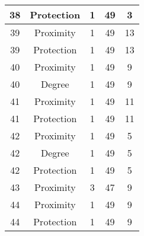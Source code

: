 \documentclass[results.tex]{subfiles}
\begin{document}
\begin{center}
\begin{tabular}{| c || c | c | c | c |}
            \hline
            38                      & Protection                   & 1                      & 49                      & 3                    \\
            \hline
            39                      & Proximity                    & 1                      & 49                      & 13                   \\
            \hline
            39                      & Protection                   & 1                      & 49                      & 13                   \\
            \hline
            40                      & Proximity                    & 1                      & 49                      & 9                    \\
            \hline
            40                      & Degree                       & 1                      & 49                      & 9                    \\
            \hline
            41                      & Proximity                    & 1                      & 49                      & 11                   \\
            \hline
            41                      & Protection                   & 1                      & 49                      & 11                   \\
            \hline
            42                      & Proximity                    & 1                      & 49                      & 5                    \\
            \hline
            42                      & Degree                       & 1                      & 49                      & 5                    \\
            \hline
            42                      & Protection                   & 1                      & 49                      & 5                    \\
            \hline
            43                      & Proximity                    & 3                      & 47                      & 9                    \\
            \hline
            44                      & Proximity                    & 1                      & 49                      & 9                    \\
            \hline
            44                      & Protection                   & 1                      & 49                      & 9                    \\

\end{tabular}
\end{center}
\end{document}
